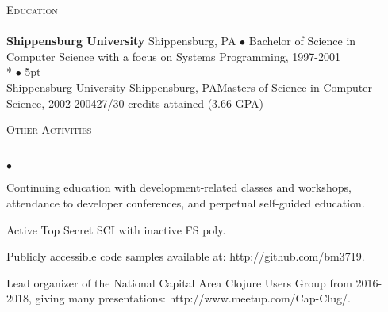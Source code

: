 \documentclass{article}
\newcommand{\lineunder}{\vspace*{-8pt} \\ \hspace*{-18pt} \hrulefill \\}
\newcommand{\header}[1]{{\hspace*{-15pt}\vspace*{7pt} \textsc{#1}} \vspace*{-7pt} \lineunder}
\newenvironment{achievements}{\begin{list}{$\bullet$}{\topsep 0pt \itemsep
      -2pt}}{\vspace*{4pt}\end{list}}
\newcommand{\schoolwithcourses}[4]{
\textbf{#1} #2 $\bullet$ #3\\
#4
\vspace*{5pt}
}
\begin{document}
\header{Education}

\schoolwithcourses{Shippensburg University}{Shippensburg, PA}{Bachelor of
  Science in Computer Science with a focus on Systems Programming, 1997-2001}

\schoolwithcourses{Shippensburg University}{Shippensburg, PA}{Masters of
  Science in Computer Science, 2002-2004}{27/30 credits attained (3.66 GPA)}

\header{Other Activities}
\begin{achievements}
\item Continuing education with development-related classes and workshops,
  attendance to developer conferences, and perpetual self-guided education.
\item Active Top Secret SCI with inactive FS poly.
\item Publicly accessible code samples available at: http://github.com/bm3719.
\item Lead organizer of the National Capital Area Clojure Users Group from
  2016-2018, giving many presentations: http://www.meetup.com/Cap-Clug/.
\end{achievements}
\end{document}
